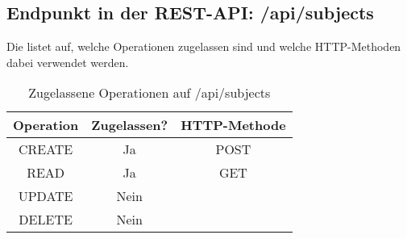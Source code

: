 \subsection{Endpunkt in der REST-API: /api/subjects}
Die  listet auf, welche Operationen zugelassen sind und welche HTTP-Methoden dabei verwendet werden. 

\begin{table}[!htbp]
	\begin{tabular}{|c|c|c|}
		\hline
			\textbf{Operation} & \textbf{Zugelassen?} & \textbf{HTTP-Methode} \\ \hline
			CREATE & Ja & POST \\ \hline 
			READ & Ja & GET \\ \hline
			UPDATE & Nein & \\ \hline 
			DELETE & Nein & \\ \hline
	\end{tabular}

		\caption{Zugelassene Operationen auf /api/subjects}
		\label{tab:end:rest:api:subjects:meth}
\end{table}